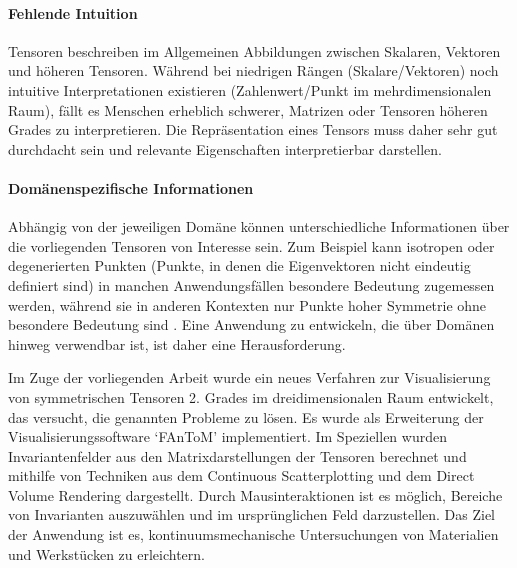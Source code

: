 \documentclass[a4paper,fontsize=12pt,toc=bib,halfparskip]{scrartcl}
\begin{document}
\paragraph{Fehlende Intuition}
Tensoren beschreiben im Allgemeinen Abbildungen zwischen Skalaren, Vektoren und h\"oheren Tensoren. W\"ahrend bei niedrigen R\"angen (Skalare/Vektoren) noch intuitive Interpretationen existieren (Zahlenwert/Punkt im mehrdimensionalen Raum), f\"allt es Menschen erheblich schwerer, Matrizen oder Tensoren h\"oheren Grades zu interpretieren. Die Repr\"asentation eines Tensors muss daher sehr gut durchdacht sein und relevante Eigenschaften interpretierbar darstellen.

\paragraph{Dom\"anenspezifische Informationen}
Abh\"angig von der jeweiligen Dom\"ane k\"onnen unterschiedliche Informationen \"uber die vorliegenden Tensoren von Interesse sein.  Zum Beispiel kann isotropen oder degenerierten Punkten (Punkte, in denen die Eigenvektoren nicht eindeutig definiert sind) in manchen Anwendungsf\"allen besondere Bedeutung zugemessen werden, w\"ahrend sie in anderen Kontexten nur Punkte hoher Symmetrie ohne besondere Bedeutung sind \cite[S.~4]{hlawitschka2014top}. Eine Anwendung zu entwickeln, die \"uber Dom\"anen hinweg verwendbar ist, ist daher eine Herausforderung.


Im Zuge der vorliegenden Arbeit wurde ein neues Verfahren zur Visualisierung von symmetrischen Tensoren 2. Grades im dreidimensionalen Raum entwickelt, das versucht, die genannten Probleme zu l\"osen. Es wurde als Erweiterung der Visualisierungssoftware `FAnToM' implementiert. Im Speziellen wurden Invariantenfelder aus den Matrixdarstellungen der Tensoren berechnet und mithilfe von Techniken aus dem Continuous Scatterplotting und dem Direct Volume Rendering dargestellt. Durch Mausinteraktionen ist es m\"oglich, Bereiche von Invarianten auszuw\"ahlen und im urspr\"unglichen Feld darzustellen. Das Ziel der Anwendung ist es, kontinuumsmechanische Untersuchungen von Materialien und Werkst\"ucken zu erleichtern.
\end{document}
